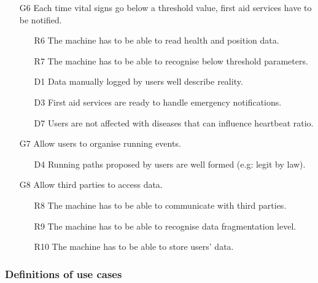 \documentclass{article}
\begin{document}
\begin{itemize}
	\item [G6] Each time vital signs go below a threshold value, first 
	aid services have to be notified.
	\begin{itemize}
		\item [R6] The machine has to be able to read health and 
		position data. 
		\item [R7] The machine has to be able to recognise below 
		threshold parameters.
		\item [D1] Data manually logged by users well describe 
		reality.
		\item [D3] First aid services are ready to handle emergency
		notiﬁcations.
		\item [D7]Users are not affected with diseases that can 
		influence heartbeat ratio.
	\end{itemize}
		
	\item [G7] Allow users to organise running events.
	\begin{itemize}
		\item [D4] Running paths proposed by users are well formed 
		(e.g: legit by law). 
	\end{itemize}
	
	\item [G8] Allow third parties to access data.
	\begin{itemize}
		\item [R8] The machine has to be able to communicate with 
		third parties. 
		\item [R9] The machine has to be able to recognise data 
		fragmentation level.
		\item [R10] The machine has to be able to store users’ data.
	\end{itemize}
	
\end{itemize}

\newpage
\subsubsection{Definitions of use cases}
\end{document}
